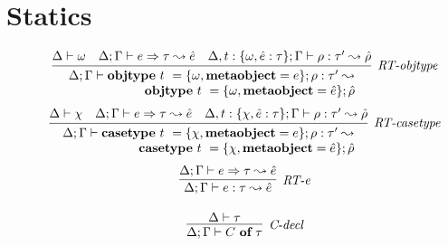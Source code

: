 \section{Statics}



\begin{figure}
\centering
\[
\begin{array}{c}

\infer[\textit{RT-objtype}]
          {\renewcommand{\arraystretch}{1}
	    \begin{array}{r}
	    \Delta; \Gamma \vdash  \keyw{objtype}~ t~=\{{\omega}, \keyw{metaobject}=e\}; \rho: \tau'\leadsto\\
            \keyw{objtype}~ t~=\{{\omega}, \keyw{metaobject}=\hat{e}\}; \hat{\rho}
            \end{array}
       }
	  {\Delta \vdash \omega & \Delta; \Gamma \vdash e \Rightarrow \tau \leadsto \hat{e} & \Delta, t:\{\omega, \hat e:\tau\}; \Gamma \vdash \rho :\tau'\leadsto \hat{\rho} }
	   \\[3ex] 


\infer[\textit{RT-casetype}]
          {\renewcommand{\arraystretch}{1}
	    \begin{array}{r}
	    \Delta; \Gamma \vdash  \keyw{casetype}~ t~=\{\chi, \keyw{metaobject}=e\}; \rho :\tau' \leadsto \\
            \keyw{casetype}~ t~=\{\chi, \keyw{metaobject}=\hat{e}\};\hat{\rho}
            \end{array}
       }
	  {\Delta \vdash \chi & \Delta; \Gamma \vdash e \Rightarrow \tau \leadsto \hat{e} & \Delta, t:\{\chi, \hat e:\tau\}; \Gamma \vdash \rho :\tau'\leadsto \hat{\rho} }
	   \\[3ex] 


\infer[\textit{RT-e}]
	{\Delta; \Gamma \vdash  e:\tau \leadsto \hat{e}} 
	{\Delta; \Gamma \vdash e \Rightarrow \tau \leadsto \hat{e}}\\[3ex]

\infer[\textit{C-decl}]
	{\Delta; \Gamma \vdash  C~\keyw{of}~\tau} 
	{\Delta \vdash \tau   }\\[3ex]


\end{array}\]
\end{figure}
